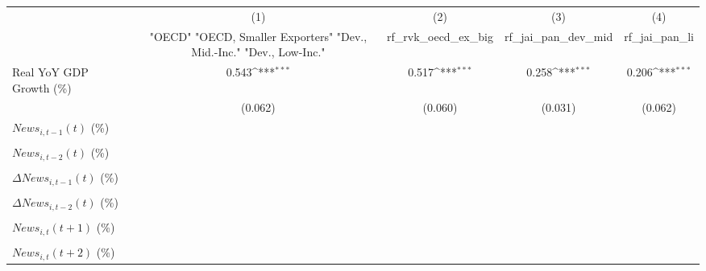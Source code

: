 {
\def\sym#1{\ifmmode^{#1}\else\(^{#1}\)\fi}
\begin{tabular}{l*{4}{c}}
\toprule
                    &\multicolumn{1}{c}{(1)}&\multicolumn{1}{c}{(2)}&\multicolumn{1}{c}{(3)}&\multicolumn{1}{c}{(4)}\\
                    &\multicolumn{1}{c}{ "OECD" "OECD, Smaller Exporters" "Dev., Mid.-Inc." "Dev., Low-Inc."}&\multicolumn{1}{c}{rf_rvk_oecd_ex_big}&\multicolumn{1}{c}{rf_jai_pan_dev_mid}&\multicolumn{1}{c}{rf_jai_pan_li}\\
\midrule
Real YoY GDP Growth (\%)&       0.543\sym{***}&       0.517\sym{***}&       0.258\sym{***}&       0.206\sym{***}\\
                    &     (0.062)         &     (0.060)         &     (0.031)         &     (0.062)         \\
\addlinespace
$ News_{i,t-1}(t)$ (\%)&                     &                     &                     &                     \\
                    &                     &                     &                     &                     \\
\addlinespace
$ News_{i,t-2}(t)$ (\%)&                     &                     &                     &                     \\
                    &                     &                     &                     &                     \\
\addlinespace
$ \Delta News_{i,t-1}(t)$ (\%)&                     &                     &                     &                     \\
                    &                     &                     &                     &                     \\
\addlinespace
$ \Delta News_{i,t-2}(t)$ (\%)&                     &                     &                     &                     \\
                    &                     &                     &                     &                     \\
\addlinespace
$ News_{i,t}(t+1)$ (\%)&                     &                     &                     &                     \\
                    &                     &                     &                     &                     \\
\addlinespace
$ News_{i,t}(t+2)$ (\%)&                     &                     &                     &                     \\

\end{tabular}}
